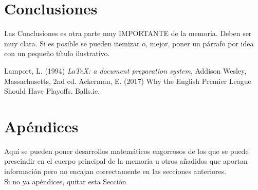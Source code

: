\documentclass[11pt,a4paper,spanish]{book}
\begin{document}
\chapter{Conclusiones}

Las Conclusiones es otra parte muy IMPORTANTE de la memoria. Deben ser muy clara. Si es posible se pueden itemizar o, mejor, poner un párrafo por idea con un pequeño título ilustrativo.

\begin{thebibliography}{a}
 Lamport, L. (1994) \emph{\LaTeX: a document preparation system}, Addison
Wesley, Massachusetts, 2nd ed.
 Ackerman, E. (2017) Why the English Premier League Should Have Playoffs.  Balls.ie. 
\end{thebibliography}
% 
%


\appendix
\chapter{Apéndices}

Aquí se pueden poner desarrollos matemáticos engorrosos de los que se puede prescindir en el cuerpo principal de la memoria u otros añadidos que aportan información pero no encajan correctamente en las secciones anteriores.\\

Si no ya apéndices, quitar esta Sección
\end{document}
